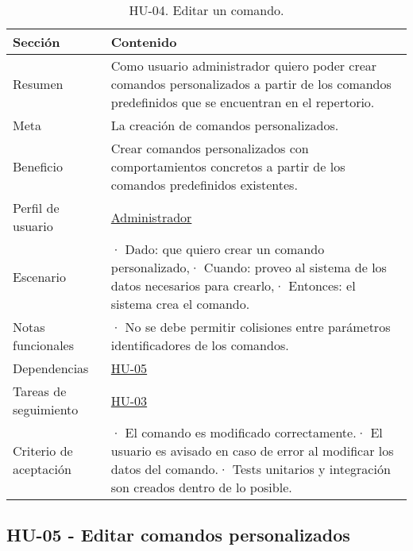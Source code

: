 \begin{table}[H]
    \centering
    \def\arraystretch{1.25}
    \begin{adjustbox}{max width=\textwidth}
    \begin{tabularx}{\textwidth}{|l|L|}
    \hline
        \textbf{Sección} & \textbf{Contenido} \\ \hline
    \hline
        Resumen & Como usuario administrador quiero poder crear comandos personalizados a partir de los comandos predefinidos que se encuentran en el repertorio. \\ \hline
        Meta & La creación de comandos personalizados. \\ \hline
        Beneficio & Crear comandos personalizados con comportamientos concretos a partir de los comandos predefinidos existentes. \\ \hline
        Perfil de usuario & \hyperref[sec:personaAdmin]{Administrador} \\ \hline
        Escenario & · Dado: que quiero crear un comando personalizado,\linebreak · Cuando: proveo al sistema de los datos necesarios para crearlo,\linebreak · Entonces: el sistema crea el comando. \\ \hline
        Notas funcionales & · No se debe permitir colisiones entre parámetros identificadores de los comandos. \\ \hline
        Dependencias & \hyperref[sec:hu05]{HU-05} \\ \hline
        Tareas de seguimiento & \hyperref[sec:hu03]{HU-03} \\ \hline
        Criterio de aceptación & · El comando es modificado correctamente.\linebreak · El usuario es avisado en caso de error al modificar los datos del comando.\linebreak · Tests unitarios y integración son creados dentro de lo posible. \\ \hline
    \end{tabularx}
    \end{adjustbox}
    \caption{HU-04. Editar un comando.}
\end{table}

\subsection{HU-05 - Editar comandos personalizados}
\label{sec:hu05}

